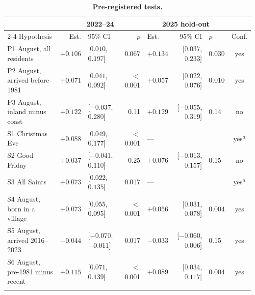 \documentclass[pdflatex,sn-mathphys-num,referee]{sn-jnl}
\begin{document}
\begin{table}[!htbp]
\caption{\textbf{Pre-registered tests.}}\label{tab:tests}
\footnotesize
\setlength{\tabcolsep}{3pt}
\begin{tabular*}{\textwidth}{@{\extracolsep\fill}lrlrlrlc}
\toprule
 & \multicolumn{3}{c}{2022--24} & \multicolumn{3}{c}{2025 hold-out} & \\
\cmidrule{2-4}\cmidrule{5-7}
Hypothesis & Est. & 95\% CI & $p$ & Est. & 95\% CI & $p$ & Conf. \\
\midrule
P1 August, all residents & $+0.106$ & [$0.010$, $0.197$] & 0.067 & $+0.134$ & [$0.037$, $0.233$] & 0.030 & yes \\
P2 August, arrived before 1981 & $+0.071$ & [$0.041$, $0.092$] & $<$0.001 & $+0.057$ & [$0.022$, $0.076$] & 0.010 & yes \\
P3 August, inland minus coast & $+0.122$ & [$-0.037$, $0.280$] & 0.11 & $+0.129$ & [$-0.055$, $0.319$] & 0.14 & no \\
\midrule
S1 Christmas Eve & $+0.088$ & [$0.049$, $0.177$] & $<$0.001 & --- & & & yes$^{a}$ \\
S2 Good Friday & $+0.037$ & [$-0.041$, $0.110$] & 0.25 & $+0.076$ & [$-0.013$, $0.157$] & 0.15 & no \\
S3 All Saints & $+0.073$ & [$0.022$, $0.135$] & 0.017 & --- & & & yes$^{a}$ \\
S4 August, born in a village & $+0.073$ & [$0.055$, $0.095$] & $<$0.001 & $+0.056$ & [$0.031$, $0.078$] & 0.004 & yes \\
S5 August, arrived 2016--2023 & $-0.044$ & [$-0.070$, $-0.011$] & 0.017 & $-0.033$ & [$-0.060$, $0.006$] & 0.15 & yes \\
S6 August, pre-1981 minus recent & $+0.115$ & [$0.071$, $0.139$] & $<$0.001 & $+0.089$ & [$0.034$, $0.117$] & 0.004 & yes \\
\botrule
\end{tabular*}
\end{table}
\end{document}
